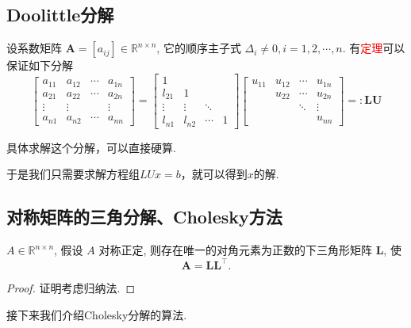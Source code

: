 \subsection{Doolittle分解}
设系数矩阵 $\boldsymbol{A}=\left[a_{i j}\right] \in \mathbb{R}^{n \times n}$, 它的顺序主子式 $\Delta_i \neq 0, i=1,2, \cdots, n$. 有\textcolor{red}{定理}可以保证如下分解
{\small
\[
    \left[\begin{array}{cccc}
            a_{11}  & a_{12}  & \cdots & a_{1 n} \\
            a_{21}  & a_{22}  & \cdots & a_{2 n} \\
            \vdots  & \vdots  &        & \vdots  \\
            a_{n 1} & a_{n 2} & \cdots & a_{n n}
        \end{array}\right]=\left[\begin{array}{cccc}
            1       &         &        &   \\
            l_{21}  & 1       &        &   \\
            \vdots  & \vdots  & \ddots &   \\
            l_{n 1} & l_{n 2} & \cdots & 1
        \end{array}\right]\left[\begin{array}{cccc}
            u_{11} & u_{12} & \cdots & u_{1 n} \\
                   & u_{22} & \cdots & u_{2 n} \\
                   &        & \ddots & \vdots  \\
                   &        &        & u_{n n}
        \end{array}\right]=: \boldsymbol{L}\boldsymbol{U}
\]}
\begin{note}
    具体求解这个分解，可以直接硬算.
\end{note}
于是我们只需要求解方程组$LUx=b$，就可以得到$x$的解.
\subsection{对称矩阵的三角分解、Cholesky方法}

\begin{theorem}\label{thm:cholesky_decomposition}
    $A \in \mathbb{R}^{n \times n}$, 假设 $A$ 对称正定, 则存在唯一的对角元素为正数的下三角形矩阵 $\boldsymbol{L}$, 使
    \[
        \boldsymbol{A}=\boldsymbol{L} \boldsymbol{L}^{\top} .
    \]
\end{theorem}
\begin{proof}
    证明考虑归纳法.
\end{proof}
接下来我们介绍Cholesky分解的算法.


